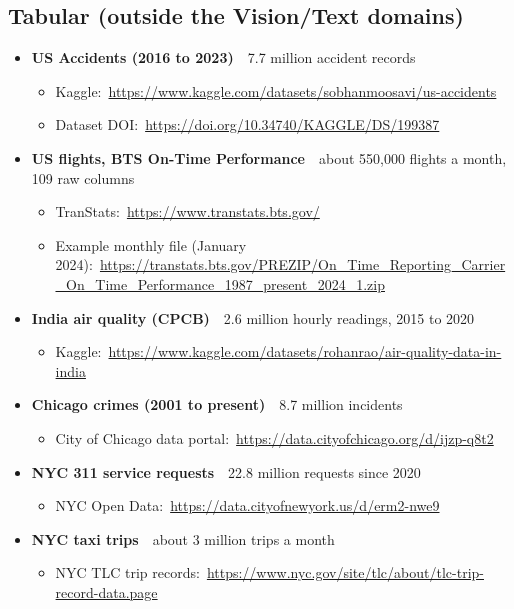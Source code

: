 \documentclass[11pt,a4paper]{article}
\newcommand{\data}[3]{\item \textbf{#1}\ \ {\color{muted}#2}\par\nopagebreak
  \begin{itemize}[leftmargin=0.9em, itemsep=1pt, topsep=1pt, label={}]#3\end{itemize}}
\newcommand{\lnk}[2]{\item #1:\ \url{#2}}
\begin{document}
\subsection{Tabular (outside the Vision/Text domains)}
\begin{itemize}
\data{US Accidents (2016 to 2023)}{7.7 million accident records}{%
  \lnk{Kaggle}{https://www.kaggle.com/datasets/sobhanmoosavi/us-accidents}%
  \lnk{Dataset DOI}{https://doi.org/10.34740/KAGGLE/DS/199387}}
\data{US flights, BTS On-Time Performance}{about 550,000 flights a month, 109 raw columns}{%
  \lnk{TranStats}{https://www.transtats.bts.gov/}%
  \lnk{Example monthly file (January 2024)}{https://transtats.bts.gov/PREZIP/On_Time_Reporting_Carrier_On_Time_Performance_1987_present_2024_1.zip}}
\data{India air quality (CPCB)}{2.6 million hourly readings, 2015 to 2020}{%
  \lnk{Kaggle}{https://www.kaggle.com/datasets/rohanrao/air-quality-data-in-india}}
\data{Chicago crimes (2001 to present)}{8.7 million incidents}{%
  \lnk{City of Chicago data portal}{https://data.cityofchicago.org/d/ijzp-q8t2}}
\data{NYC 311 service requests}{22.8 million requests since 2020}{%
  \lnk{NYC Open Data}{https://data.cityofnewyork.us/d/erm2-nwe9}}
\data{NYC taxi trips}{about 3 million trips a month}{%
  \lnk{NYC TLC trip records}{https://www.nyc.gov/site/tlc/about/tlc-trip-record-data.page}}
\end{itemize}
\end{document}
